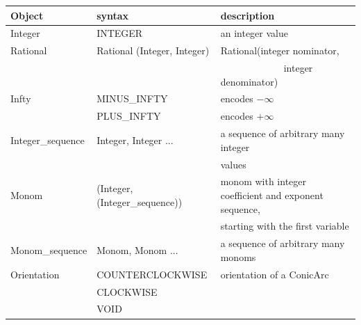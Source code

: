 \begin{ccTexOnly}
\begin{tabular}{*{3}{| l} |} \hline
Object   & syntax                         & description \\ \hline \hline
Integer  & INTEGER                        & an integer value \\ \hline
Rational & Rational (Integer, Integer)    & Rational(integer nominator, \\
         &                                & \ \ \ \ \ \ \ \ \ \ \ \ \ integer denominator)
                                            \\ \hline
Infty    & MINUS\_INFTY                   & encodes $-\infty$ \\ 
         & PLUS\_INFTY                    & encodes $+\infty$  \\ \hline

Integer\_sequence & Integer, Integer ...
                        & a sequence of arbitrary many integer  \\ 
                  &     &  values \\ \hline
Monom & (Integer, (Integer\_sequence)) & monom with integer coefficient and exponent sequence, \\
      &                                & starting with the first variable \\ \hline
Monom\_sequence & Monom, Monom ... & a sequence of arbitrary many monoms \\ \hline
Orientation & COUNTERCLOCKWISE            & orientation of a ConicArc  \\
            & CLOCKWISE                   &           \\
            & VOID                        &           \\ \hline


\end{tabular}
\end{ccTexOnly}
